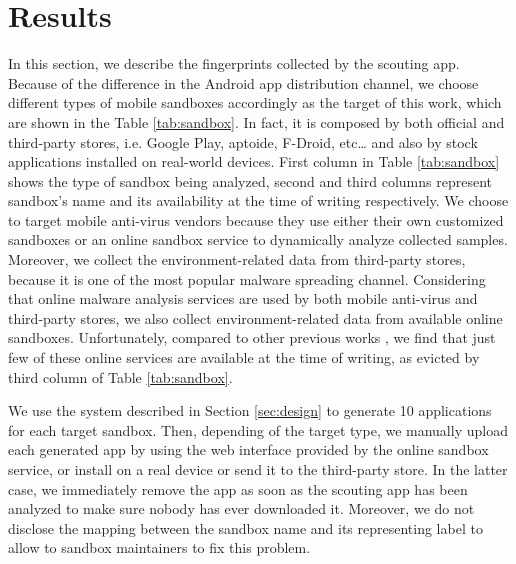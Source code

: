 \section{Results} 
\label{sec:res}
In this section, we describe the fingerprints collected by the scouting app. 
Because of the difference in the Android app distribution channel, 
we choose different types of mobile sandboxes accordingly as the target of this work, which are shown in the Table \ref{tab:sandbox}. In fact, it is composed by both official and third-party stores, i.e. Google Play, aptoide, F-Droid, etc\ldots
and also by stock applications installed on real-world devices. First column in Table \ref{tab:sandbox} shows the type of sandbox being analyzed, second and third columns represent sandbox's name and its availability at the time of writing respectively.
We choose to target mobile anti-virus vendors because they use either their own customized sandboxes or an online sandbox service to dynamically analyze collected samples. Moreover, we collect the environment-related data from third-party stores, because it is one of the most popular malware spreading channel. Considering that online malware analysis services are used by both mobile anti-virus and third-party stores, we also collect environment-related data from available online sandboxes. Unfortunately, compared to other previous works \cite{vidas2014evading,petsas2014rage,neuner2014enter,spreitzenbarth2013mobile}, we find that just few of these online services are available at the time of writing, as evicted by third column of Table \ref{tab:sandbox}.

We use the system described in Section \ref{sec:design} to generate 10 applications for each target sandbox. Then, depending of the target type, we manually upload each generated app by using the web interface provided by the online sandbox service, or install on a real device or send it to the third-party store. In the latter case, we immediately remove the app as soon as the scouting app has been analyzed to make sure nobody has ever downloaded it. Moreover, we do not disclose the mapping between the sandbox name and its representing label to allow to sandbox maintainers to fix this problem.


